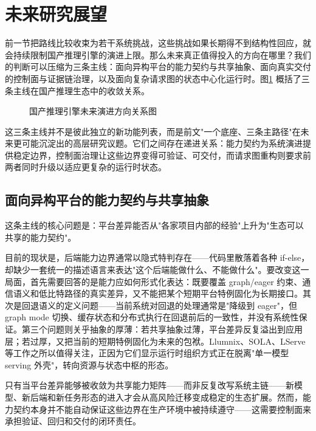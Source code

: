 \section{未来研究展望}

前一节把路线比较收束为若干系统挑战，这些挑战如果长期得不到结构性回应，就会持续限制国产推理引擎的演进上限。那么未来真正值得投入的方向在哪里？我们的判断可以压缩为三条主线：面向异构平台的能力契约与共享抽象、面向真实交付的控制面与证据链治理，以及面向复杂请求图的状态中心化运行时。图\ref{fig:outlook-map} 概括了三条主线在国产推理生态中的收敛关系。

\begin{figure}[!htb]
\centering
\resizebox{0.94\linewidth}{!}{}
\caption{国产推理引擎未来演进方向关系图}
\label{fig:outlook-map}
\end{figure}

这三条主线并不是彼此独立的新功能列表，而是前文"一个底座、三条主路径"在未来更可能沉淀出的高层研究议题。它们之间存在递进关系：能力契约为系统演进提供稳定边界，控制面治理让这些边界变得可验证、可交付，而请求图重构则要求前两者同时升级以适应更复杂的运行时状态。

\subsection{面向异构平台的能力契约与共享抽象}

这条主线的核心问题是：平台差异能否从"各家项目内部的经验"上升为"生态可以共享的能力契约"。

目前的现状是，后端能力边界通常以隐式特判存在——代码里散落着各种 if-else，却缺少一套统一的描述语言来表达"这个后端能做什么、不能做什么"。要改变这一局面，首先需要回答的是能力应如何形式化表达：既要覆盖 graph/eager 约束、通信语义和低比特路径的真实差异，又不能把某个短期平台特例固化为长期接口。其次是回退语义的定义问题——当前系统对回退的处理通常是"降级到 eager"，但 graph mode 切换、缓存状态和分布式执行在回退前后的一致性，并没有系统性保证。第三个问题则关乎抽象的厚薄：若共享抽象过薄，平台差异反复溢出到应用层；若过厚，又把当前的短期特例固化为未来的包袱。Llumnix、SOLA、LServe 等工作之所以值得关注，正因为它们显示运行时组织方式正在脱离"单一模型 serving 外壳"，转向资源与状态中枢的形态\citep{sun2024llumnix,hong2025sola,yang2025lserve}。

只有当平台差异能够被收敛为共享能力矩阵——而非反复改写系统主链——新模型、新后端和新任务形态的进入才会从高风险迁移变成稳定的生态扩展。然而，能力契约本身并不能自动保证这些边界在生产环境中被持续遵守——这需要控制面来承担验证、回归和交付的闭环责任。

